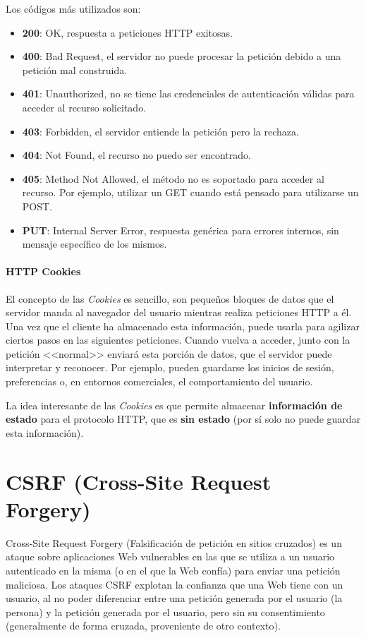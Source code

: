Los códigos más utilizados son:

\begin{itemize}
	\item \textbf{200}: OK, respuesta a peticiones HTTP exitosas.
  \item \textbf{400}: Bad Request, el servidor no puede procesar la petición
  debido a una petición mal construida.
  \item \textbf{401}: Unauthorized, no se tiene las credenciales de
  autenticación válidas para acceder al recurso solicitado.
  \item \textbf{403}: Forbidden, el servidor entiende la petición pero la
  rechaza.
  \item \textbf{404}: Not Found, el recurso no puedo ser encontrado.
  \item \textbf{405}: Method Not Allowed, el método no es soportado para acceder
  al recurso. Por ejemplo, utilizar un GET cuando está pensado para utilizarse
  un POST.
  \item \textbf{PUT}: Internal Server Error, respuesta genérica para errores
  internos, sin mensaje específico de los mismos.
\end{itemize}

\paragraph{HTTP Cookies}

El concepto de las \textit{Cookies} es sencillo, son pequeños bloques de datos
que el servidor manda al navegador del usuario mientras realiza peticiones HTTP
a él. Una vez que el cliente ha almacenado esta información, puede usarla para
agilizar ciertos pasos en las siguientes peticiones. Cuando vuelva a acceder,
junto con la petición <<normal>> enviará esta porción de datos, que el servidor
puede interpretar y reconocer. Por ejemplo, pueden guardarse los inicios de
sesión, preferencias o, en entornos comerciales, el comportamiento del usuario.

La idea interesante de las \textit{Cookies} es que permite almacenar
\textbf{información de estado} para el protocolo HTTP, que es \textbf{sin
estado} (por sí solo no puede guardar esta información).

\section{CSRF (Cross-Site Request Forgery)}
Cross-Site Request Forgery (Falsificación de petición en sitios cruzados) es un
ataque sobre aplicaciones Web vulnerables en las que se utiliza a un usuario
autenticado en la misma (o en el que la Web confía) para enviar una petición
maliciosa. Los ataques CSRF explotan la confianza que una Web tiene con un
usuario, al no poder diferenciar entre una petición generada por el usuario (la
persona) y la petición generada por el usuario, pero sin su consentimiento
\cite{csrf} (generalmente de forma cruzada, proveniente de otro contexto).

